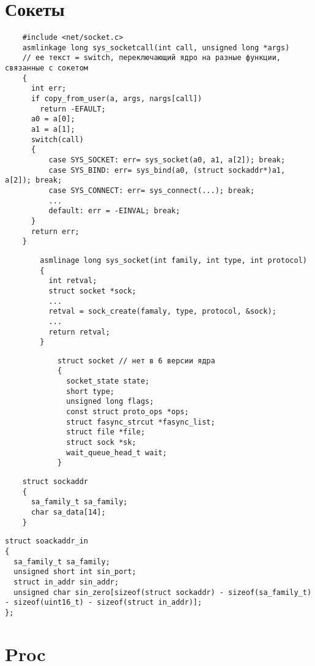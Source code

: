 \section*{Сокеты}

\begin{lstlisting}
	#include <net/socket.c>
	asmlinkage long sys_socketcall(int call, unsigned long *args)
	// ее текст = switch, переключающий ядро на разные функции, связанные с сокетом
	{
	  int err;
	  if copy_from_user(a, args, nargs[call])
		return -EFAULT;
	  a0 = a[0];
	  a1 = a[1];
	  switch(call)
	  {
		  case SYS_SOCKET: err= sys_socket(a0, a1, a[2]); break;
		  case SYS_BIND: err= sys_bind(a0, (struct sockaddr*)a1, a[2]); break;
		  case SYS_CONNECT: err= sys_connect(...); break;
		  ...
		  default: err = -EINVAL; break;
	  }
	  return err;
	}
	\end{lstlisting}

	\begin{lstlisting}
		asmlinage long sys_socket(int family, int type, int protocol)
		{
		  int retval;
		  struct socket *sock;
		  ...
		  retval = sock_create(famaly, type, protocol, &sock);
		  ...
		  return retval;
		}
		\end{lstlisting}
		
\begin{lstlisting}
			struct socket // нет в 6 версии ядра
			{
			  socket_state state;
			  short type;
			  unsigned long flags;
			  const struct proto_ops *ops;
			  struct fasync_strcut *fasync_list;
			  struct file *file;
			  struct sock *sk;
			  wait_queue_head_t wait;
			}
\end{lstlisting}

\begin{lstlisting}
	struct sockaddr
	{
	  sa_family_t sa_family;
	  char sa_data[14]; 
	}
\end{lstlisting}

\begin{lstlisting}
struct soackaddr_in
{
  sa_family_t sa_family;
  unsigned short int sin_port;
  struct in_addr sin_addr;
  unsigned char sin_zero[sizeof(struct sockaddr) - sizeof(sa_family_t) - sizeof(uint16_t) - sizeof(struct in_addr)];
};
\end{lstlisting}			

\section*{Proc}

